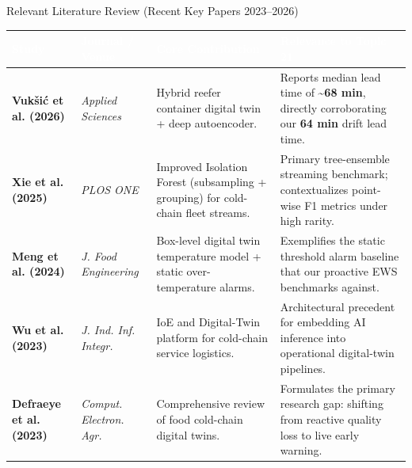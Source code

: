 \documentclass[aspectratio=169, 10pt]{beamer}
\begin{document}
\begin{frame}{Relevant Literature Review (Recent Key Papers 2023--2026)}
    \centering
    \scriptsize
    \renewcommand{\arraystretch}{1.2}
    \begin{tabularx}{\textwidth}{L{2.2cm} L{2.2cm} Y Y}
        \toprule
        \textbf{\textcolor{white}{Study}} & \textbf{\textcolor{white}{Journal / Venue}} & \textbf{\textcolor{white}{Core Contribution}} & \textbf{\textcolor{white}{Relevance to Topic 21}} \\
        \midrule
        \textbf{Vuk\v{s}i\'{c} et al. (2026)} & \textit{Applied Sciences} & Hybrid reefer container digital twin + deep autoencoder. & Reports median lead time of \textbf{\~{}68 min}, directly corroborating our \textbf{64 min} drift lead time. \\
        \textbf{Xie et al. (2025)} & \textit{PLOS ONE} & Improved Isolation Forest (subsampling + grouping) for cold-chain fleet streams. & Primary tree-ensemble streaming benchmark; contextualizes point-wise F1 metrics under high rarity. \\
        \textbf{Meng et al. (2024)} & \textit{J. Food Engineering} & Box-level digital twin temperature model + static over-temperature alarms. & Exemplifies the static threshold alarm baseline that our proactive EWS benchmarks against. \\
        \textbf{Wu et al. (2023)} & \textit{J. Ind. Inf. Integr.} & IoE and Digital-Twin platform for cold-chain service logistics. & Architectural precedent for embedding AI inference into operational digital-twin pipelines. \\
        \textbf{Defraeye et al. (2023)} & \textit{Comput. Electron. Agr.} & Comprehensive review of food cold-chain digital twins. & Formulates the primary research gap: shifting from reactive quality loss to live early warning. \\
        \bottomrule
    \end{tabularx}
\end{frame}
\end{document}
